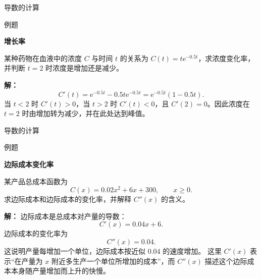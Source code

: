 \documentclass[aspectratio=169,10pt,fontset=fandol]{ctexbeamer}
\newcommand{\ee}{\mathrm{e}}
\begin{document}
\begin{frame}[t,fragile]{导数的计算}
\normalsize
\begin{block}{例题}
{\normalsize
\textbf{增长率}\par

某种药物在血液中的浓度 $C$ 与时间 $t$ 的关系为 $C(t)=t\ee^{-0.5t}$，求浓度变化率，并判断 $t=2$ 时浓度是增加还是减少。

}
\end{block}
\pause
{\normalsize
\textbf{解：}
\[
C'(t)=\ee^{-0.5t}-0.5t\ee^{-0.5t}=\ee^{-0.5t}(1-0.5t).
\]
当 \(t<2\) 时 \(C'(t)>0\)，当 \(t>2\) 时 \(C'(t)<0\)，且 \(C'(2)=0\)。因此浓度在 \(t=2\) 时由增加转为减少，并在此处达到峰值。

}
\end{frame}
\begin{frame}[t,fragile]{导数的计算}
\normalsize
\begin{block}{例题}
{\normalsize
\textbf{边际成本变化率}\par

某产品总成本函数为
\[
C(x)=0.02x^2+6x+300,\qquad x\geq0.
\]
求边际成本和边际成本的变化率，并解释 $C''(x)$ 的含义。

}
\end{block}
\pause
{\normalsize
\textbf{解：}
边际成本是总成本对产量的导数：
\[
C'(x)=0.04x+6.
\]
边际成本的变化率为
\[
C''(x)=0.04.
\]
这说明产量每增加一个单位，边际成本按近似 $0.04$ 的速度增加。 这里 $C'(x)$ 表示“在产量为 $x$ 附近多生产一个单位所增加的成本”，而 $C''(x)$ 描述这个边际成本本身随产量增加而上升的快慢。

}
\end{frame}
\end{document}
